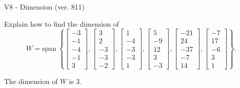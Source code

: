 \begin{exercise}
  \begin{exerciseTitle}V8 - Dimension (ver. 811)\end{exerciseTitle}
  \begin{exerciseStatement}
    Explain how to find the dimension of 
\[W=\mathrm{span}\ \left\{\left[\begin{array}{r}
-3 \\
-1 \\
-4 \\
-1 \\
3
\end{array}\right] , \left[\begin{array}{r}
3 \\
2 \\
-3 \\
-3 \\
-2
\end{array}\right] , \left[\begin{array}{r}
1 \\
-4 \\
-3 \\
-3 \\
1
\end{array}\right] , \left[\begin{array}{r}
5 \\
-9 \\
12 \\
3 \\
-3
\end{array}\right] , \left[\begin{array}{r}
-21 \\
24 \\
-37 \\
-7 \\
14
\end{array}\right] , \left[\begin{array}{r}
-7 \\
17 \\
-6 \\
3 \\
1
\end{array}\right]\right\}.\]



  \end{exerciseStatement}
  \begin{exerciseAnswer}
   The dimension of \(W\) is  \(3\).
  


  \end{exerciseAnswer}
\end{exercise}